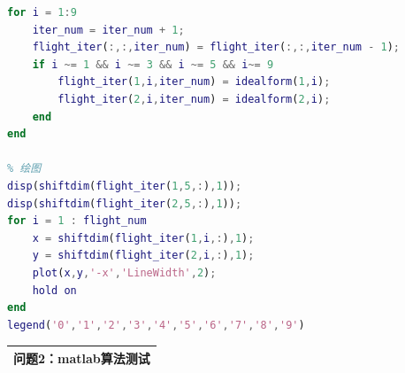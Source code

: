 \documentclass{my_paper}
\begin{document}
\begin{lstlisting}[language=Matlab]
% 其余节点调整
for i = 1:9
    iter_num = iter_num + 1;
    flight_iter(:,:,iter_num) = flight_iter(:,:,iter_num - 1);
    if i ~= 1 && i ~= 3 && i ~= 5 && i~= 9
        flight_iter(1,i,iter_num) = idealform(1,i);
        flight_iter(2,i,iter_num) = idealform(2,i);
    end
end

% 绘图
disp(shiftdim(flight_iter(1,5,:),1));
disp(shiftdim(flight_iter(2,5,:),1));
for i = 1 : flight_num
    x = shiftdim(flight_iter(1,i,:),1);
    y = shiftdim(flight_iter(2,i,:),1);
    plot(x,y,'-x','LineWidth',2);
    hold on
end
legend('0','1','2','3','4','5','6','7','8','9')
\end{lstlisting}

\begin{table}[htbp]
    \centering
    \begin{tabular}{|p{14.0cm}|}
    \hline
    \textbf{问题2：matlab算法测试} \\ %
    \hline
    \end{tabular}
\end{table}
\end{document}
